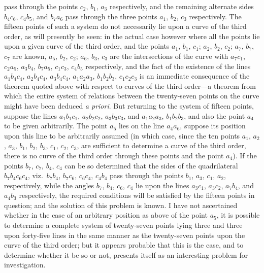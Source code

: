 \documentclass[11pt,a4paper]{article}
\theoremstyle{definition}
\begin{document}
pass through the points $c_{2}$, $b_{1}$, $a_{3}$ respectively, and the remaining alternate sides $b_{4}c_{6}$, $c_{4}b_{5}$, and $b_{7}a_{6}$ pass through the three points $a_{1}$, $b_{2}$, $c_{3}$ respectively. The fifteen points of such a system do not necessarily lie upon a curve of the third order, as will presently be seen: in the actual case however where all the points lie upon a given curve of the third order, and the points $a_{1}$, $b_{1}$, $c_{1}$; $a_{2}$, $b_{2}$, $c_{2}$; $a_{7}$, $b_{7}$, $c_{7}$ are known, $a_{5}$, $b_{2}$, $c_{2}$; $a_{6}$, $b_{3}$, $c_{3}$ are the intersections of the curve with $a_{7}c_{1}$, $c_{2}a_{5}$, $a_{3}b_{4}$, $b_{7}a_{5}$, $c_{1}c_{3}$, $c_{4}b_{5}$ respectively, and the fact of the existence of the lines $a_{1}b_{4}c_{4}$, $a_{2}b_{4}c_{4}$, $a_{3}b_{4}c_{4}$, $a_{1}a_{2}a_{3}$, $b_{1}b_{2}b_{3}$, $c_{1}c_{2}c_{3}$ is an immediate consequence of the theorem quoted above with respect to curves of the third order---a theorem from which the entire system of relations between the twenty-seven points on the curve might have been deduced \textit{a priori}. But returning to the system of fifteen points, suppose the lines $a_{1}b_{1}c_{1}$, $a_{2}b_{2}c_{2}$, $a_{3}b_{3}c_{3}$, and $a_{1}a_{2}a_{3}$, $b_{1}b_{2}b_{3}$, and also the point $a_{4}$ to be given arbitrarily. The point $a_{5}$ lies on the line $a_{4}a_{6}$, suppose its position upon this line to be arbitrarily assumed (in which case, since the ten points $a_{1}$, $a_{2}$, $a_{3}$, $b_{1}$, $b_{2}$, $b_{3}$, $c_{1}$, $c_{2}$, $c_{3}$, are sufficient to determine a curve of the third order, there is no curve of the third order through these points and the point $a_{4}$). If the points $b_{7}$, $c_{7}$, $b_{4}$, $c_{4}$ can be so determined that the sides of the quadrilateral $b_{7}b_{4}c_{6}c_{4}$, viz.\ $b_{7}b_{4}$, $b_{7}c_{6}$, $c_{6}c_{4}$, $c_{4}b_{4}$ pass through the points $b_{1}$, $a_{3}$, $c_{1}$, $a_{2}$, respectively, while the angles $b_{7}$, $b_{4}$, $c_{6}$, $c_{4}$ lie upon the lines $a_{3}c_{1}$, $a_{3}c_{2}$, $a_{7}b_{4}$, and $a_{4}b_{3}$ respectively, the required conditions will be satisfied by the fifteen points in question; and the solution of this problem is known. I have not ascertained whether in the case of an arbitrary position as above of the point $a_{5}$, it is possible to determine a complete system of twenty-seven points lying three and three upon forty-five lines in the same manner as the twenty-seven points upon the curve of the third order; but it appears probable that this is the case, and to determine whether it be so or not, presents itself as an interesting problem for investigation.
\end{document}
